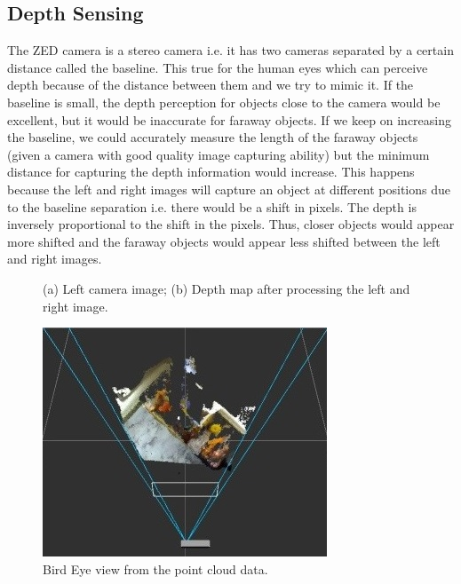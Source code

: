 \documentclass{IEEEtran}
\newcommand{\figwidthb}{0.80\linewidth}
\begin{document}
\subsection{Depth Sensing}
The ZED camera is a stereo camera i.e. it has two cameras separated by a certain distance called the baseline. This true for the human eyes which can perceive depth because of the distance between them and we try to mimic it. If the baseline is small, the depth perception for objects close to the camera would be excellent, but it would be inaccurate for faraway objects. If we keep on increasing the baseline, we could accurately measure the length of the faraway objects (given a camera with good quality image capturing ability) but the minimum distance for capturing the depth information would increase. This happens because the left and right images will capture an object at different positions due to the baseline separation i.e. there would be a shift in pixels. The depth is inversely proportional to the shift in the pixels. Thus, closer objects would appear more shifted and the faraway objects would appear less shifted between the left and right images.

\begin{figure}[htb]
\centerline{ \hfil
{}
} \caption{(a) Left camera image; (b) Depth map after processing the left and right image.} \label{fig.doublefigure}
\end{figure}

\begin{figure}[htb]
\centering
\includegraphics[width=\figwidthb]{fig/bird_eye}
\caption{ Bird Eye view from the point cloud data.} \label{fig.structure}
\end{figure}
\end{document}
